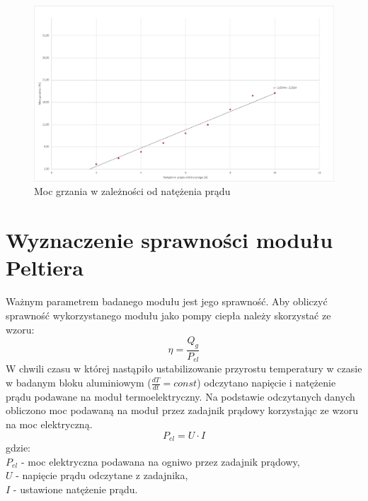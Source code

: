 \documentclass[oneside]{mgr}
\begin{document}
\begin{center}
\begin{figure}[h!]
    \centering
    \includegraphics[width=\textwidth]{Qgrzanie_wykres.png}
    \caption{Moc grzania w zależności od natężenia prądu}
    \end{figure}
\end{center}

\section{Wyznaczenie sprawności modułu Peltiera}
Ważnym parametrem badanego modułu jest jego sprawność. Aby obliczyć sprawność wykorzystanego modułu jako pompy ciepła należy skorzystać ze wzoru:
\begin{equation}
    \eta = \frac{Q_g}{P_{el}}
\end{equation}
W chwili czasu w której nastąpiło ustabilizowanie przyrostu temperatury w czasie w badanym bloku aluminiowym ($\frac{dT}{dt} = const$) odczytano napięcie i natężenie prądu podawane na moduł termoelektryczny. Na podstawie odczytanych danych obliczono moc podawaną na moduł przez zadajnik prądowy korzystając ze wzoru na moc elektryczną.
\begin{equation}
    P_{el} = U \cdot I
\end{equation}
gdzie: \\
$P_{el}$ - moc elektryczna podawana na ogniwo przez zadajnik prądowy, \\
$U$ - napięcie prądu odczytane z zadajnika, \\
$I$ - ustawione natężenie prądu. \\
\end{document}

